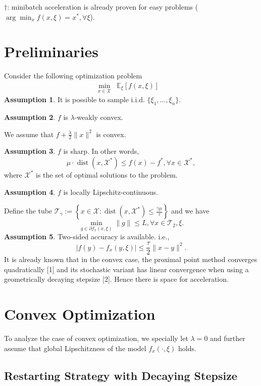 \documentclass{article}
\newcommand{\assign}{:=}
\newcommand{\cdummy}{\cdot}
\newcommand{\tmop}[1]{\ensuremath{\operatorname{#1}}}
\newcommand{\tmstrong}[1]{\textbf{#1}}
\begin{document}
$\dag$: minibatch acceleration is already proven for easy problems ($\arg
\min_x f (x, \xi) = x^{\ast}, \forall \xi$).

\section{Preliminaries}

Consider the following optimization problem
\begin{eqnarray*}
  \min_{x \in \mathcal{X}} & \mathbb{E}_{\xi} [f (x, \xi)] & 
\end{eqnarray*}
{\tmstrong{Assumption 1}}. It is possible to sample i.i.d. $\{ \xi_1, \ldots,
\xi_n \}$.

{\tmstrong{Assumption 2}}. $f$ is $\lambda$-weakly convex.

We assume that $f + \frac{\lambda}{2} \| x \|^2$ is convex.

{\tmstrong{Assumption 3}}. $f$ is sharp. In other words,
\[ \mu \cdummy \tmop{dist} (x, \mathcal{X}^{\ast}) \leq f (x) - f^{\ast},
   \forall x \in \mathcal{X}^{\ast}, \]
where $\mathcal{X}^{\ast}$ is the set of optimal solutions to the problem.

{\tmstrong{Assumption 4}}. $f$ is locally Lipschitz-continuous.

Define the tube $\mathcal{T}_{\gamma} \assign \left\{ x \in \mathcal{X}:
\tmop{dist} (x, \mathcal{X}^{\ast}) \leq \frac{\gamma \mu}{\tau} \right\}$ and
we have
\[ \min_{g \in \partial f_x (x, \xi)} \| g \| \leq L, \forall x \in
   \mathcal{T}_2, \xi . \]
{\tmstrong{Assumption 5}}. Two-sided accuracy is available. i.e.,
\[ | f (y) - f_x (y, \xi) | \leq \frac{\tau}{2} \| x - y \|^2 . \]
It is already known that in the convex case, the proximal point method
converges quadratically [1] and its stochastic variant has linear convergence
when using a geometrically decaying stepsize [2]. Hence there is space for
acceleration.

\section{Convex Optimization}

To analyze the case of convex optimization, we specially let $\lambda = 0$ and
further assume that global Lipschitzness of the model $f_x (\cdummy, \xi)$
holds.

\subsection{Restarting Strategy with Decaying Stepsize}
\end{document}
